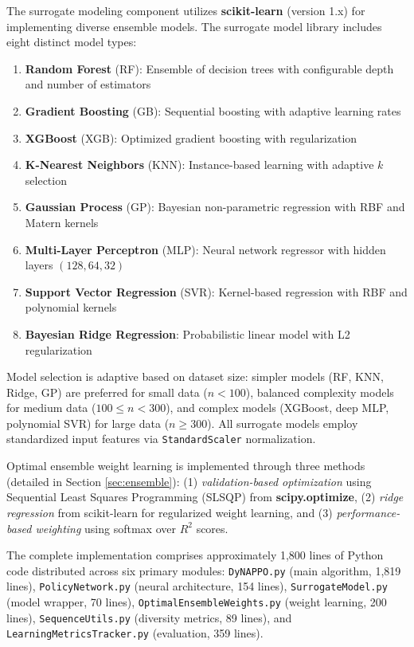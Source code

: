\documentclass[conference]{IEEEtran}
\begin{document}
The surrogate modeling component utilizes \textbf{scikit-learn} (version 1.x) for implementing diverse ensemble models. The surrogate model library includes eight distinct model types:
\begin{enumerate}
    \item \textbf{Random Forest} (RF): Ensemble of decision trees with configurable depth and number of estimators
    \item \textbf{Gradient Boosting} (GB): Sequential boosting with adaptive learning rates
    \item \textbf{XGBoost} (XGB): Optimized gradient boosting with regularization
    \item \textbf{K-Nearest Neighbors} (KNN): Instance-based learning with adaptive $k$ selection
    \item \textbf{Gaussian Process} (GP): Bayesian non-parametric regression with RBF and Matern kernels
    \item \textbf{Multi-Layer Perceptron} (MLP): Neural network regressor with hidden layers $(128, 64, 32)$
    \item \textbf{Support Vector Regression} (SVR): Kernel-based regression with RBF and polynomial kernels
    \item \textbf{Bayesian Ridge Regression}: Probabilistic linear model with L2 regularization
\end{enumerate}

Model selection is adaptive based on dataset size: simpler models (RF, KNN, Ridge, GP) are preferred for small data ($n < 100$), balanced complexity models for medium data ($100 \leq n < 300$), and complex models (XGBoost, deep MLP, polynomial SVR) for large data ($n \geq 300$). All surrogate models employ standardized input features via \texttt{StandardScaler} normalization.

Optimal ensemble weight learning is implemented through three methods (detailed in Section \ref{sec:ensemble}): (1) \textit{validation-based optimization} using Sequential Least Squares Programming (SLSQP) from \textbf{scipy.optimize}, (2) \textit{ridge regression} from scikit-learn for regularized weight learning, and (3) \textit{performance-based weighting} using softmax over $R^2$ scores.

The complete implementation comprises approximately 1,800 lines of Python code distributed across six primary modules: \texttt{DyNAPPO.py} (main algorithm, 1,819 lines), \texttt{PolicyNetwork.py} (neural architecture, 154 lines), \texttt{SurrogateModel.py} (model wrapper, 70 lines), \texttt{OptimalEnsembleWeights.py} (weight learning, 200 lines), \texttt{SequenceUtils.py} (diversity metrics, 89 lines), and \texttt{LearningMetricsTracker.py} (evaluation, 359 lines).
\end{document}
